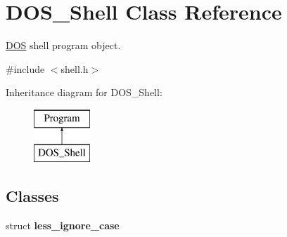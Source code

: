 \hypertarget{classDOS__Shell}{\section{D\-O\-S\-\_\-\-Shell Class Reference}
\label{classDOS__Shell}
}


\hyperlink{classDOS}{D\-O\-S} shell program object.  




{\ttfamily \#include $<$shell.\-h$>$}

Inheritance diagram for D\-O\-S\-\_\-\-Shell\-:\begin{figure}[H]
\begin{center}
\leavevmode
\includegraphics[height=2.000000cm]{classDOS__Shell}
\end{center}
\end{figure}
\subsection*{Classes}
\begin{DoxyCompactItemize}
\item 
struct {\bfseries less\-\_\-ignore\-\_\-case}
\end{DoxyCompactItemize}
